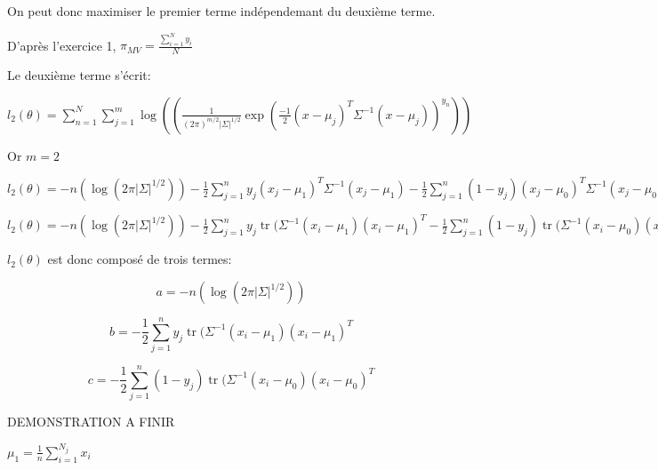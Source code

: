 \documentclass{article}
\DeclareMathOperator{\tr}{tr}
\begin{document}
On peut donc maximiser le premier terme indépendemant du deuxième terme.

D'après l'exercice 1, $\pi_{MV} = \frac{\sum_{i=1}^N y_i}{N}$

Le deuxième terme s'écrit:

$l_2(\theta) = \sum_{n=1}^N \sum_{j=1}^m
\log((\frac{1}{(2\pi)^{m/2}|\Sigma|^{1/2}}\exp(\frac{-1}{2}(x-\mu_j)^{T}\Sigma^{-1}(x-\mu_j))^{y_n}))$

Or $m =2$

%

$l_2(\theta) = -n(\log(2\pi|\Sigma|^{1/2})) - \frac{1}{2}\sum_{j=1}^{n}y_j(x_j - \mu_1)^T\Sigma^{-1}(x_j - \mu_1)
- \frac{1}{2}\sum_{j=1}^{n}(1 - y_j)(x_j - \mu_0)^T\Sigma^{-1}(x_j - \mu_0)$


$l_2(\theta) = -n(\log(2\pi|\Sigma|^{1/2})) - \frac{1}{2}\sum_{j=1}^{n} y_j \tr(\Sigma^{-1} (x_i - \mu_1)(x_i - \mu_1)^T - \frac{1}{2}\sum_{j=1}^{n} (1 - y_j)\tr(\Sigma^{-1} (x_i - \mu_0)(x_i - \mu_0)^T$

$l_2(\theta)$ est donc composé de trois termes:

\begin{equation}
a = -n(\log(2\pi|\Sigma|^{1/2}))
\end{equation}

\begin{equation}
b = - \frac{1}{2}\sum_{j=1}^{n} y_j \tr(\Sigma^{-1} (x_i - \mu_1)(x_i - \mu_1)^T
\end{equation}


\begin{equation}
c = - \frac{1}{2}\sum_{j=1}^{n} (1 - y_j)\tr(\Sigma^{-1} (x_i - \mu_0)(x_i - \mu_0)^T
\end{equation}

DEMONSTRATION A FINIR

$\mu_1 = \frac{1}{n} \sum_{i=1}^{N_j}x_i$
\end{document}
